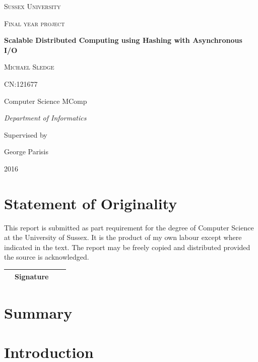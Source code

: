 \documentclass{article}
\begin{document}
\begin{titlepage}
	\centering
	{\scshape\LARGE Sussex University \par}
	\vspace{1cm}
	{\scshape\Large Final year project\par}
	\vspace{1.5cm}
	{\huge\bfseries Scalable Distributed Computing using Hashing with Asynchronous I/O\par}
	\vspace{2cm}
	{\Large\scshape Michael Sledge\par}
	{\Large CN:121677\par}
	\vspace{1cm}
	{\Large Computer Science MComp\par}
	{\Large\itshape Department of Informatics\par}
	\vspace{1cm}
	{Supervised by}\par
	{\large George Parisis}

	\vfill

	{\large 2016\par}
\end{titlepage}

\section*{Statement of Originality}
This report is submitted as part requirement for the degree of Computer Science at the University of Sussex. It is the product of my own labour except where indicated in the text. The report may be freely copied and distributed provided the source is acknowledged.
\begin{table}[b]
\centering
\bgroup
\def\arraystretch{2.5}
\begin{tabularx}{0.8\textwidth}{|l c l|X|}
\hline
& Signature & & \\\hline
\end{tabularx}
\egroup
\end{table}

\newpage

\section*{Summary}


\newpage
\tableofcontents
\newpage


\section{Introduction}
\end{document}
